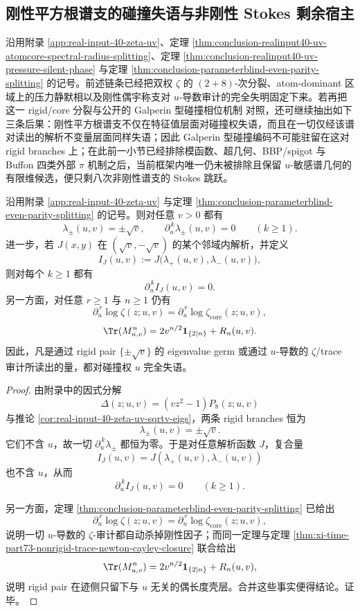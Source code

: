 \subsection{刚性平方根谱支的碰撞失语与非刚性 Stokes 剩余宿主}\label{subsec:conclusion-realinput40-rigid-branch-phase-obstruction}
沿用附录 \ref{app:real-input-40-zeta-uv}、定理 \ref{thm:conclusion-realinput40-uv-atomcore-spectral-radius-splitting}、定理 \ref{thm:conclusion-realinput40-uv-pressure-silent-phase} 与定理 \ref{thm:conclusion-parameterblind-even-parity-splitting} 的记号。前述链条已经把双权 \(\zeta\) 的 \((2+8)\)-次分裂、atom-dominant 区域上的压力静默相以及刚性偶宇称支对 \(u\)-导数审计的完全失明固定下来。若再把这一 rigid/core 分裂与公开的 Galperin 型碰撞相位机制 \cite{AretxabaletaEtAl2020GalperinDigitsPi} 对照，还可继续抽出如下三条后果：刚性平方根谱支不仅在特征值层面对碰撞权失语，而且在一切仅经该谱对读出的解析不变量层面同样失语；因此 Galperin 型碰撞编码不可能驻留在这对 rigid branches 上；在此前一小节已经排除模函数、超几何、BBP/spigot 与 Buffon 四类外部 \(\pi\) 机制之后，当前框架内唯一仍未被排除且保留 \(u\)-敏感谱几何的有限维候选，便只剩八次非刚性谱支的 Stokes 跳跃。

\begin{theorem}\label{thm:conclusion-realinput40-rigid-sqrt-branch-collision-blindness}
沿用附录 \ref{app:real-input-40-zeta-uv} 与定理 \ref{thm:conclusion-parameterblind-even-parity-splitting} 的记号。则对任意 \(v>0\) 都有
\[
\lambda_\pm(u,v)=\pm\sqrt v,
\qquad
\partial_u^{\,k}\lambda_\pm(u,v)=0
\qquad (k\ge 1).
\]
进一步，若 \(J(x,y)\) 在 \((\sqrt v,-\sqrt v)\) 的某个邻域内解析，并定义
\[
I_J(u,v):=J\!\bigl(\lambda_+(u,v),\lambda_-(u,v)\bigr),
\]
则对每个 \(k\ge 1\) 都有
\[
\partial_u^{\,k}I_J(u,v)=0.
\]
另一方面，对任意 \(r\ge 1\) 与 \(n\ge 1\) 仍有
\[
\partial_u^{\,r}\log\zeta(z;u,v)
=
\partial_u^{\,r}\log\zeta_{\mathrm{core}}(z;u,v),
\]
\[
\Tr(M_{u,v}^n)=2v^{n/2}\mathbf 1_{\{2\mid n\}}+R_n(u,v).
\]
因此，凡是通过 rigid pair \(\{\pm\sqrt v\}\) 的 eigenvalue germ 或通过 \(u\)-导数的 \(\zeta\)/trace 审计所读出的量，都对碰撞权 \(u\) 完全失语。
\end{theorem}
\begin{proof}
由附录中的因式分解
\[
\Delta(z;u,v)=(vz^2-1)P_8(z;u,v)
\]
与推论 \ref{cor:real-input-40-zeta-uv-sqrtv-eigs}，两条 rigid branches 恒为
\[
\lambda_\pm(u,v)=\pm\sqrt v.
\]
它们不含 \(u\)，故一切 \(\partial_u^{\,k}\lambda_\pm\) 都恒为零。于是对任意解析函数 \(J\)，复合量
\[
I_J(u,v)=J(\lambda_+(u,v),\lambda_-(u,v))
\]
也不含 \(u\)，从而
\[
\partial_u^{\,k}I_J(u,v)=0
\qquad (k\ge 1).
\]

另一方面，定理 \ref{thm:conclusion-parameterblind-even-parity-splitting} 已给出
\[
\partial_u^{\,r}\log\zeta(z;u,v)
=
\partial_u^{\,r}\log\zeta_{\mathrm{core}}(z;u,v),
\]
说明一切 \(u\)-导数的 \(\zeta\)-审计都自动杀掉刚性因子；而同一定理与定理 \ref{thm:xi-time-part73-nonrigid-trace-newton-cayley-closure} 联合给出
\[
\Tr(M_{u,v}^n)=2v^{n/2}\mathbf 1_{\{2\mid n\}}+R_n(u,v),
\]
说明 rigid pair 在迹侧只留下与 \(u\) 无关的偶长度壳层。合并这些事实便得结论。证毕。
\end{proof}

